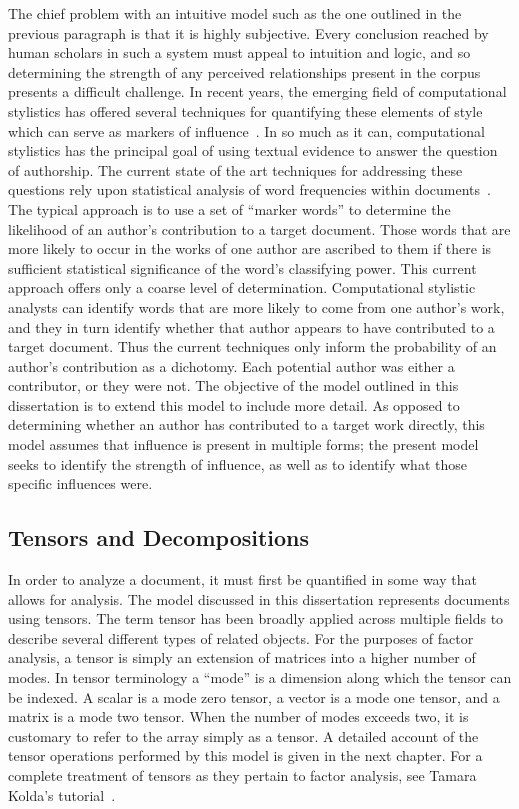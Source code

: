 \documentclass[../dissertation.tex]{subfiles}
\begin{document}
The chief problem with an intuitive model such as the one outlined in
the previous paragraph is that it is highly subjective.  Every
conclusion reached by human scholars in such a system must appeal to
intuition and logic, and so determining the strength of any perceived
relationships present in the corpus presents a difficult challenge.
In recent years, the emerging field of computational stylistics has
offered several techniques for quantifying these elements of style
which can serve as markers of influence~\cite{bader2007, craig2009,
  burrows2017}.  In so much as it can, computational stylistics has
the principal goal of using textual evidence to answer the question of
authorship.  The current state of the art techniques for addressing
these questions rely upon statistical analysis of word frequencies
within documents~\cite{craig2009}.  The typical approach is to use a
set of ``marker words'' to determine the likelihood of an author's
contribution to a target document.  Those words that are more likely
to occur in the works of one author are ascribed to them if there is
sufficient statistical significance of the word's classifying power.
This current approach offers only a coarse level of determination.
Computational stylistic analysts can identify words that are more
likely to come from one author's work, and they in turn identify
whether that author appears to have contributed to a target document.
Thus the current techniques only inform the probability of an author's
contribution as a dichotomy.  Each potential author was either a
contributor, or they were not.  The objective of the model outlined in
this dissertation is to extend this model to include more detail.  As
opposed to determining whether an author has contributed to a target
work directly, this model assumes that influence is present in
multiple forms; the present model seeks to identify the strength of
influence, as well as to identify what those specific influences were.

\subsection{Tensors and Decompositions}
In order to analyze a document, it must first be quantified in some
way that allows for analysis.  The model discussed in this
dissertation represents documents using tensors.  The term tensor has
been broadly applied across multiple fields to describe several
different types of related objects.  For the purposes of factor
analysis, a tensor is simply an extension of matrices into a higher
number of modes. In tensor terminology a ``mode'' is a dimension along
which the tensor can be indexed.  A scalar is a mode zero tensor, a
vector is a mode one tensor, and a matrix is a mode two tensor.  When
the number of modes exceeds two, it is customary to refer to the array
simply as a tensor.  A detailed account of the tensor operations
performed by this model is given in the next chapter.  For a complete
treatment of tensors as they pertain to factor analysis, see Tamara
Kolda's tutorial~\cite{kolda2009}.
\end{document}
